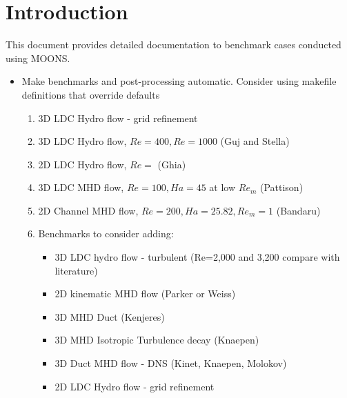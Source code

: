 \documentclass[11pt]{article}
\begin{document}
\doublespacing
\MOONSTITLE
\maketitle

\section{Introduction}
This document provides detailed documentation to benchmark cases conducted using MOONS.

\begin{itemize}
\setlength\itemsep{-1em}
\item Make benchmarks and post-processing automatic. Consider using makefile definitions that override defaults
\begin{enumerate}
\setlength\itemsep{-1em}
\item 3D LDC Hydro flow - grid refinement
\item 3D LDC Hydro flow, $Re = 400, Re = 1000$ (Guj and Stella)
\item 2D LDC Hydro flow, $Re = $ (Ghia)
\item 3D LDC MHD flow, $Re = 100, Ha = 45$ at low $Re_m$ (Pattison)
\item 2D Channel MHD flow, $Re = 200, Ha = 25.82, Re_m = 1$ (Bandaru)
\item Benchmarks to consider adding:
\begin{itemize}
\setlength\itemsep{-1em}
\item 3D LDC hydro flow - turbulent (Re=2,000 and 3,200 compare with literature)
\item 2D kinematic MHD flow (Parker or Weiss)
\item 3D MHD Duct (Kenjeres)
\item 3D MHD Isotropic Turbulence decay (Knaepen)
\item 3D Duct MHD flow - DNS (Kinet, Knaepen, Molokov)
\item 2D LDC Hydro flow - grid refinement
\end{itemize}
\end{enumerate}
\end{itemize}
\end{document}
